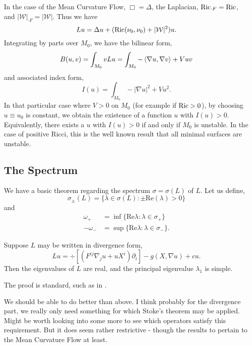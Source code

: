 \documentclass{amsart}
\begin{document}
\begin{rem}
In the case of the Mean Curvature Flow, \(\Box = \Delta\), the Laplacian, \(\operatorname{Ric}_{\cdot{F}} = \operatorname{Ric}\), and \(|\mathcal{W}|_{\cdot{F}} = |\mathcal{W}|\). Thus we have
\[
L u = \Delta u + (\operatorname{Ric}(\nu_0, \nu_0) + |\mathcal{W}|^2) u.
\]
Integrating by parts over \(M_0\), we have the bilinear form,
\[
B(u, v) = \int_{M_0} v Lu = \int_{M_0} -\left\langle \nabla u,\nabla v \right\rangle + V uv 
\]
and associated index form,
\[
I(u) = \int_{M_0} -|\nabla u|^2 + V u^2.
\]
In that particular case where \(V > 0\) on \(M_0\) (for example if \(\operatorname{Ric} > 0\)), by choosing \(u \equiv u_0\) is constant, we obtain the existence of a function \(u\) with \(I(u) > 0\). Equivalently, there exists a \(u\) with \(I(u) > 0\) if and only if \(M_0\) is unstable. In the case of positive Ricci, this is the well known result that all minimal surfaces are unstable.
\end{rem}

\subsection{The Spectrum}
\label{subsec:spectrum}

We have a basic theorem regarding the spectrum \(\sigma = \sigma(L)\) of \(L\). Let us define,
\[
\sigma_{\pm} (L) = \{\lambda \in \sigma(L) : \pm \text{Re}(\lambda) > 0\}
\]
and
\begin{align*}
\omega_+ &= \inf \{\text{Re} \lambda : \lambda \in \sigma_+\} \\
- \omega_- &= \sup \{\text{Re} \lambda : \lambda \in \sigma_-\}.
\end{align*}

\begin{thm}
Suppose \(L\) may be written in divergence form,
\[
L u = \div\left[\left(F^{ij} \nabla_j u + u X^i\right)\partial_i\right] - g(X, \nabla u) + c u.
\]
Then the eigenvalues of \(L\) are real, and the principal eigenvalue \(\lambda_1\) is simple.
\end{thm}

The proof is standard, such as in \cite[Theorems 8.37, 8.38]{GilbargTrudinger:/2001}.

\begin{rem}
We should be able to do better than above. I think probably for the divergence part, we really only need something for which Stoke's theorem may be applied. Might be worth looking into some more to see which operators satisfy this requirement. But it does seem rather restrictive - though the results to pertain to the Mean Curvature Flow at least.
\end{rem}
\end{document}
